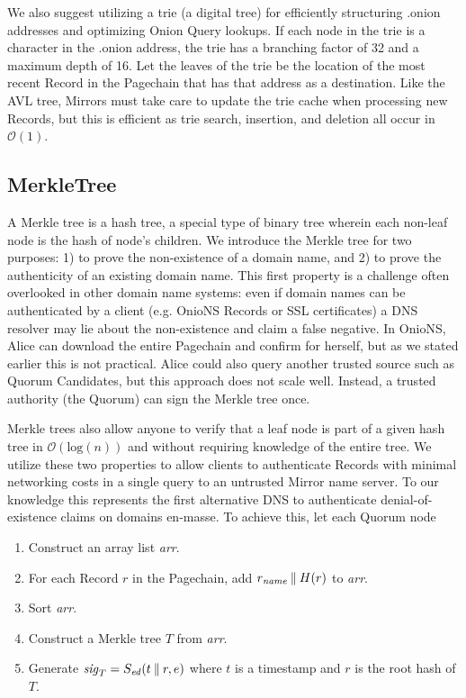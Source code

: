 We also suggest utilizing a trie (a digital tree) for efficiently structuring .onion addresses and optimizing Onion Query lookups. If each node in the trie is a character in the .onion address, the trie has a branching factor of 32 and a maximum depth of 16. Let the leaves of the trie be the location of the most recent Record in the Pagechain that has that address as a destination. Like the AVL tree, Mirrors must take care to update the trie cache when processing new Records, but this is efficient as trie search, insertion, and deletion all occur in $ \mathcal{O}(1) $.

\subsection{MerkleTree}
\label{sec:MerkleTree}

A Merkle tree is a hash tree, a special type of binary tree wherein each non-leaf node is the hash of node's children. We introduce the Merkle tree for two purposes: 1) to prove the non-existence of a domain name, and 2) to prove the authenticity of an existing domain name. This first property is a challenge often overlooked in other domain name systems: even if domain names can be authenticated by a client (e.g. OnioNS Records or SSL certificates) a DNS resolver may lie about the non-existence and claim a false negative. In OnioNS, Alice can download the entire Pagechain and confirm for herself, but as we stated earlier this is not practical. Alice could also query another trusted source such as Quorum Candidates, but this approach does not scale well. Instead, a trusted authority (the Quorum) can sign the Merkle tree once.

Merkle trees also allow anyone to verify that a leaf node is part of a given hash tree in $ \mathcal{O}(\mathrm{log}(n)) $ and without requiring knowledge of the entire tree. We utilize these two properties to allow clients to authenticate Records with minimal networking costs in a single query to an untrusted Mirror name server. To our knowledge this represents the first alternative DNS to authenticate denial-of-existence claims on domains en-masse. To achieve this, let each Quorum node

\begin{enumerate}
	\item Construct an array list \emph{arr}.
	\item For each Record $ r $ in the Pagechain, add $ r_{\mathit{name}} \mathbin{\|} H(r) $ to \emph{arr}.
	\item Sort \emph{arr}.
	\item Construct a Merkle tree $ T $ from \emph{arr}.
	\item Generate $ \mathit{sig}_{T} = S_{\mathit{ed}}(t \mathbin{\|} r, e) $ where $ t $ is a timestamp and $ r $ is the root hash of $ T $.
\end{enumerate}

